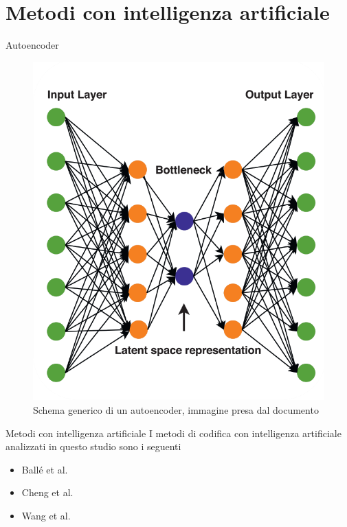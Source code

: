 \section{Metodi con intelligenza artificiale}

    \begin{frame}{Autoencoder}
        \begin{figure}[t!]
            \centering
            \includegraphics[width=0.5\textheight]{Immagini/Autoencoder_scheme.png}
            \caption{Schema generico di un autoencoder, immagine presa dal documento \cite{mishra2022deep}}
            \label{fig:schemeAutoencoder}
        \end{figure}
    \end{frame}

    \begin{frame}{Metodi con intelligenza artificiale}
        I metodi di codifica con intelligenza artificiale analizzati in questo studio sono i seguenti
        \begin{itemize}
            \item Ballé et al. \cite{minnen2018joint}
            \item Cheng et al. \cite{cheng2020learned}
            \item Wang et al. \cite{wang2022neural} 
        \end{itemize}
    \end{frame}

